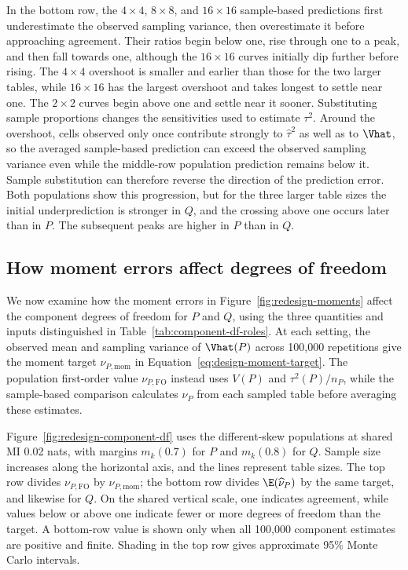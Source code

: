 In the bottom row, the \(4\times4\), \(8\times8\), and
\(16\times16\) sample-based predictions first underestimate the
observed sampling variance, then overestimate it before approaching
agreement. Their ratios begin below one, rise through one to a peak,
and then fall towards one, although the \(16\times16\) curves initially
dip further before rising. The \(4\times4\) overshoot is smaller and
earlier than those for the two larger tables, while \(16\times16\)
has the largest overshoot and takes longest to settle near one.
The \(2\times2\) curves begin above one and settle near it sooner.
Substituting sample proportions changes the sensitivities used to
estimate \(\tau^2\). Around the overshoot, cells observed only once
contribute strongly to \(\widehat\tau^2\) as well as to \(\Vhat\),
so the averaged sample-based prediction can exceed the observed
sampling variance even while the middle-row population prediction
remains below it. Sample substitution can therefore reverse the
direction of the prediction error. Both populations show this
progression, but for the three larger table sizes the initial
underprediction is stronger in \(Q\), and the crossing above one
occurs later than in \(P\). The subsequent peaks are higher in \(P\)
than in \(Q\).

\FloatBarrier
\subsection{How moment errors affect degrees of freedom}

We now examine how the moment errors in Figure~\ref{fig:redesign-moments}
affect the component degrees of freedom for \(P\) and \(Q\), using the
three quantities and inputs distinguished in Table~\ref{tab:component-df-roles}. At each setting, the observed
mean and sampling variance of \(\Vhat(P)\) across 100,000 repetitions
give the moment target \(\nu_{P,\mathrm{mom}}\) in
Equation~\eqref{eq:design-moment-target}. The population first-order value
\(\nu_{P,\mathrm{FO}}\) instead uses \(V(P)\) and \(\tau^2(P)/n_P\),
while the sample-based comparison calculates \(\widehat\nu_P\) from
each sampled table before averaging these estimates.


Figure~\ref{fig:redesign-component-df} uses the different-skew populations
at shared MI 0.02 nats, with margins \(m_k(0.7)\) for \(P\) and
\(m_k(0.8)\) for \(Q\). Sample size increases along the horizontal axis,
and the lines represent table sizes. The top row divides
\(\nu_{P,\mathrm{FO}}\) by \(\nu_{P,\mathrm{mom}}\); the bottom row divides
\(\E(\widehat\nu_P)\) by the same target, and likewise for \(Q\).
On the shared vertical scale, one indicates agreement, while values below
or above one indicate fewer or more degrees of freedom than the target. A bottom-row value is shown only when all 100,000 component
estimates are positive and finite. Shading in the top row gives approximate
95\% Monte Carlo intervals.

